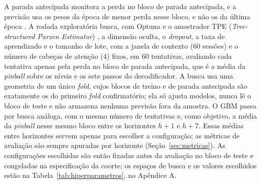 A parada antecipada monitora a perda no bloco de parada antecipada, e a previsão usa os pesos da época de menor perda nesse bloco, e não os da última época \cite{PRECHELT1998}. A rodada exploratória busca, com Optuna \cite{AKIBA2019} e o amostrador TPE (\textit{Tree-structured Parzen Estimator}) \cite{BERGSTRA2011}, a dimensão oculta, o \textit{dropout}, a taxa de aprendizado e o tamanho de lote, com a janela de contexto (60 sessões) e o número de cabeças de atenção (4) fixos, em 60 tentativas, avaliando cada tentativa apenas pela perda no bloco de parada antecipada, que é a média da \textit{pinball} sobre os níveis e os sete passos do decodificador. A busca usa uma geometria de um único \textit{fold}, cujos blocos de treino e de parada antecipada são exatamente os do primeiro \textit{fold} confirmatório; ela só ajusta modelos, nunca lê o bloco de teste e não armazena nenhuma previsão fora da amostra. O GBM passa por busca análoga, com o mesmo número de tentativas e, como objetivo, a média da \textit{pinball} nesse mesmo bloco entre os horizontes \(h+1\) e \(h+7\). Essas médias entre horizontes servem apenas para escolher a configuração; as métricas de avaliação são sempre apuradas por horizonte (Seção~\ref{sec:metricas}). As configurações escolhidas são então fixadas antes da avaliação no bloco de teste \cite{RASCHKA2018} e congeladas na especificação da coorte; os espaços de busca e os valores escolhidos estão na Tabela~\ref{tab:hiperparametros}, no Apêndice A.

